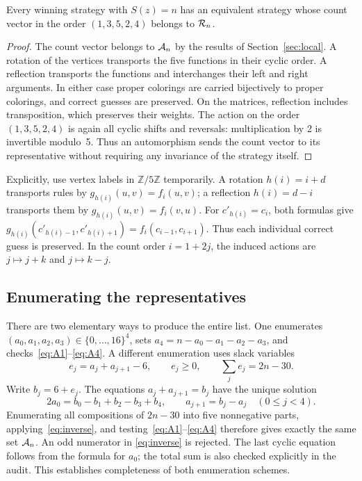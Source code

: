 \begin{lemma}\label{lem:dihedral}
Every winning strategy with $S(z)=n$ has an equivalent strategy whose
count vector in the order $(1,3,5,2,4)$ belongs to $\mathcal{R}_n$.
\end{lemma}
\begin{proof}
The count vector belongs to $\mathcal{A}_n$ by the results of
Section~\ref{sec:local}. A rotation of the vertices transports the five
functions in their cyclic order. A reflection transports the functions
and interchanges their left and right arguments. In either case proper
colorings are carried bijectively to proper colorings, and correct guesses
are preserved. On the matrices, reflection includes transposition, which
preserves their weights. The action on the order $(1,3,5,2,4)$ is again all
cyclic shifts and reversals: multiplication by 2 is invertible modulo~5.
Thus an automorphism sends the count vector to its representative without
requiring any invariance of the strategy itself.
\end{proof}

Explicitly, use vertex labels in $\mathbb Z/5\mathbb Z$ temporarily. A rotation
$h(i)=i+d$ transports rules by $g_{h(i)}(u,v)=f_i(u,v)$; a reflection
$h(i)=d-i$ transports them by $g_{h(i)}(u,v)=f_i(v,u)$. For
$c'_{h(i)}=c_i$, both formulas give
$g_{h(i)}(c'_{h(i)-1},c'_{h(i)+1})=f_i(c_{i-1},c_{i+1})$.
Thus each individual correct guess is preserved. In the count order
$i=1+2j$, the induced actions are $j\mapsto j+k$ and $j\mapsto k-j$.

\subsection{Enumerating the representatives}
There are two elementary ways to produce the entire list. One enumerates
$(a_0,a_1,a_2,a_3)\in\{0,\ldots,16\}^4$, sets
$a_4=n-a_0-a_1-a_2-a_3$, and checks~\eqref{eq:A1}--\eqref{eq:A4}. A
different enumeration uses slack variables
\begin{equation}\label{eq:slack}
e_j=a_j+a_{j+1}-6,\qquad e_j\geq0,\qquad\sum_je_j=2n-30.
\end{equation}
Write $b_j=6+e_j$. The equations $a_j+a_{j+1}=b_j$ have the unique solution
\begin{equation}\label{eq:inverse}
2a_0=b_0-b_1+b_2-b_3+b_4,\qquad
a_{j+1}=b_j-a_j\quad(0\leq j<4).
\end{equation}
Enumerating all compositions of $2n-30$ into five nonnegative parts,
applying~\eqref{eq:inverse}, and testing~\eqref{eq:A1}--\eqref{eq:A4}
therefore gives exactly the same set $\mathcal{A}_n$. An odd numerator in
\eqref{eq:inverse} is rejected. The last cyclic equation follows from the
formula for $a_0$; the total sum is also checked explicitly in the audit.
This establishes completeness of both enumeration schemes.

